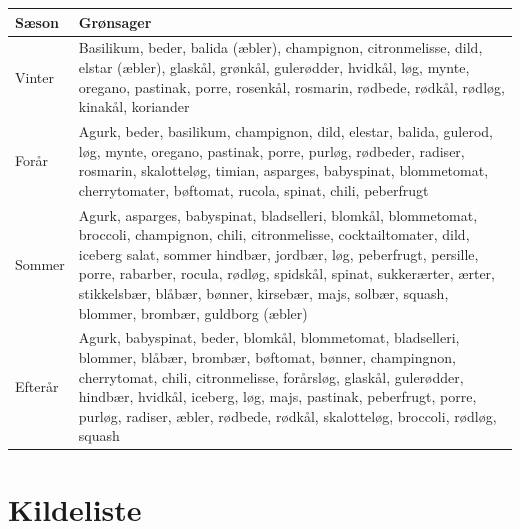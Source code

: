 \documentclass[11pt, a4paper]{article}
\begin{document}
\begin{longtable}{|l|l|}
	\hline
	\textbf{Sæson} & \textbf{Grønsager}\\ \hline
    Vinter & Basilikum, beder, balida (æbler), champignon, citronmelisse, dild, elstar (æbler), glaskål, grønkål, gulerødder, hvidkål, løg, mynte, oregano, pastinak, porre, rosenkål, rosmarin, rødbede, rødkål, rødløg, kinakål, koriander\\ \hline
    Forår & Agurk, beder, basilikum, champignon, dild, elestar, balida, gulerod, løg, mynte, oregano, pastinak, porre, purløg, rødbeder, radiser, rosmarin, skalotteløg, timian, asparges, babyspinat, blommetomat, cherrytomater, bøftomat, rucola, spinat, chili, peberfrugt\\ \hline
    Sommer & Agurk, asparges, babyspinat, bladselleri, blomkål, blommetomat, broccoli, champignon, chili, citronmelisse, cocktailtomater, dild, iceberg salat, sommer hindbær, jordbær,  løg, peberfrugt, persille, porre, rabarber, rocula, rødløg, spidskål, spinat, sukkerærter, ærter, stikkelsbær, blåbær, bønner, kirsebær, majs, solbær, squash, blommer, brombær, guldborg (æbler)\\ \hline
    Efterår & Agurk, babyspinat, beder, blomkål, blommetomat, bladselleri, blommer, blåbær, brombær, bøftomat, bønner, champingnon, cherrytomat, chili, citronmelisse, forårsløg, glaskål, gulerødder, hindbær, hvidkål, iceberg, løg, majs, pastinak, peberfrugt, porre, purløg, radiser, æbler, rødbede, rødkål, skalotteløg, broccoli, rødløg, squash\\ \hline
\end{longtable}


\newpage
\section{Kildeliste}
\end{document}

